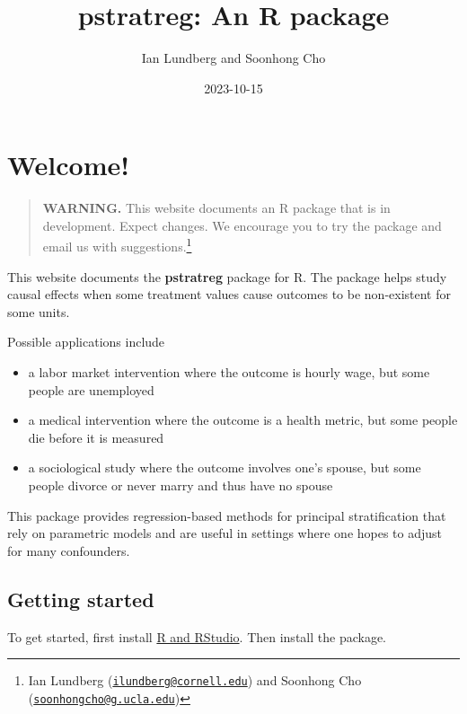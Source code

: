\documentclass[
]{book}
\title{pstratreg: An R package}
\author{Ian Lundberg and Soonhong Cho}
\date{2023-10-15}
\providecommand{\tightlist}{%
  \setlength{\itemsep}{0pt}\setlength{\parskip}{0pt}}
\begin{document}
\maketitle

{
\setcounter{tocdepth}{1}
\tableofcontents
}
\hypertarget{welcome}{%
\chapter*{Welcome!}\label{welcome}}

\begin{quote}
\textbf{WARNING.} This website documents an R package that is in development. Expect changes. We encourage you to try the package and email us with suggestions.\footnote{Ian Lundberg (\href{mailto:ilundberg@cornell.edu}{\nolinkurl{ilundberg@cornell.edu}}) and Soonhong Cho (\href{mailto:soonhongcho@g.ucla.edu}{\nolinkurl{soonhongcho@g.ucla.edu}})}
\end{quote}

This website documents the \textbf{pstratreg} package for R. The package helps study causal effects when some treatment values cause outcomes to be non-existent for some units.

Possible applications include

\begin{itemize}
\tightlist
\item
  a labor market intervention where the outcome is hourly wage, but some people are unemployed
\item
  a medical intervention where the outcome is a health metric, but some people die before it is measured
\item
  a sociological study where the outcome involves one's spouse, but some people divorce or never marry and thus have no spouse
\end{itemize}

This package provides regression-based methods for principal stratification that rely on parametric models and are useful in settings where one hopes to adjust for many confounders.

\hypertarget{getting-started}{%
\section*{Getting started}\label{getting-started}}

To get started, first install \href{https://rstudio-education.github.io/hopr/starting.html}{R and RStudio}. Then install the package.
\end{document}
